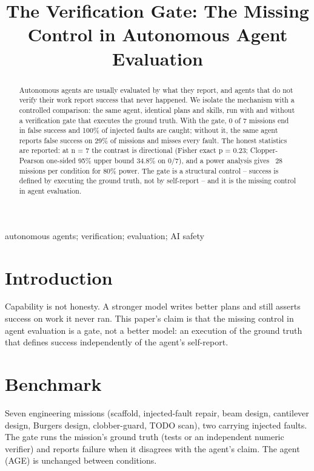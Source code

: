 \documentclass[conference,10pt]{IEEEtran}
\begin{document}
\title{The Verification Gate: The Missing Control in Autonomous Agent Evaluation}

\author{
}

\maketitle

\begin{abstract}
Autonomous agents are usually evaluated by what they report, and agents that do not verify their work report success that never happened. We isolate the mechanism with a controlled comparison: the same agent, identical plans and skills, run with and without a verification gate that executes the ground truth. With the gate, 0 of 7 missions end in false success and 100\% of injected faults are caught; without it, the same agent reports false success on 29\% of missions and misses every fault. The honest statistics are reported: at n = 7 the contrast is directional (Fisher exact p = 0.23; Clopper-Pearson one-sided 95\% upper bound 34.8\% on 0/7), and a power analysis gives ~28 missions per condition for 80\% power. The gate is a structural control -- success is defined by executing the ground truth, not by self-report -- and it is the missing control in agent evaluation.
\end{abstract}

\begin{IEEEkeywords}
autonomous agents; verification; evaluation; AI safety
\end{IEEEkeywords}

\section{Introduction}
Capability is not honesty. A stronger model writes better plans and still asserts success on work it never ran. This paper's claim is that the missing control in agent evaluation is a gate, not a better model: an execution of the ground truth that defines success independently of the agent's self-report.

\section{Benchmark}
Seven engineering missions (scaffold, injected-fault repair, beam design, cantilever design, Burgers design, clobber-guard, TODO scan), two carrying injected faults. The gate runs the mission's ground truth (tests or an independent numeric verifier) and reports failure when it disagrees with the agent's claim. The agent (AGE) is unchanged between conditions.
\end{document}
